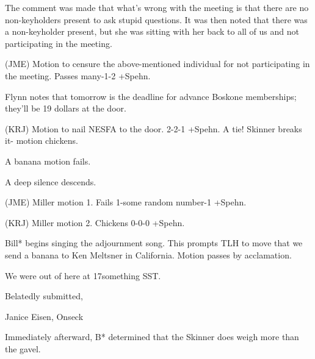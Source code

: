 \documentclass[12pt]{article}
\begin{document}
The comment was made that what's wrong with the meeting is that there are no non-keyholders present to ask stupid questions. It was then noted that there was a non-keyholder present, but she was sitting with her back to all of us and not participating in the meeting.

(JME) Motion to censure the above-mentioned individual for not participating in the meeting. Passes many-1-2 +Spehn.

Flynn notes that tomorrow is the deadline for advance Boskone memberships; they'll be 19 dollars at the door.

(KRJ) Motion to nail NESFA to the door. 2-2-1 +Spehn. A tie! Skinner breaks it- motion chickens.

A banana motion fails.

A deep silence descends.

(JME) Miller motion 1. Fails 1-some random number-1 +Spehn.

(KRJ) Miller motion 2. Chickens 0-0-0 +Spehn.

Bill* begins singing the adjournment song. This prompts TLH to move that we send a banana to Ken Meltsner in California. Motion passes by acclamation.

\vspace{12pt}

\noindent
We were out of here at 17something SST.

\vspace{18pt}

\centerline{Belatedly submitted,}
\centerline{Janice Eisen, Onseck}

Immediately afterward, B* determined that the Skinner does weigh more than the gavel.
\end{document}
